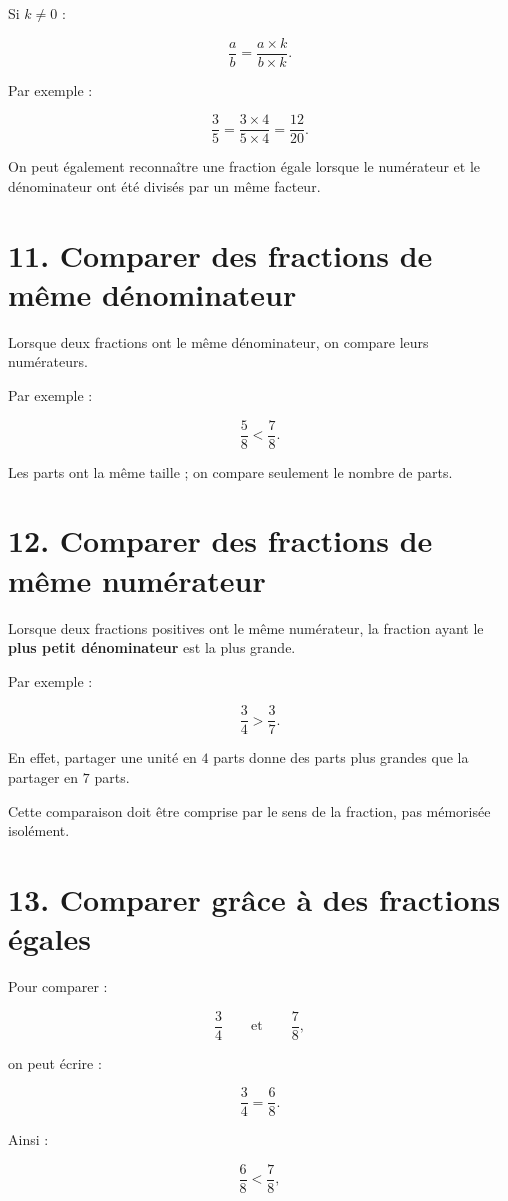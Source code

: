 Si $k\neq0$ :

\[
\boxed{
\dfrac{a}{b}
=
\dfrac{a\times k}{b\times k}
}.
\]

Par exemple :

\[
\dfrac{3}{5}
=
\dfrac{3\times4}{5\times4}
=
\dfrac{12}{20}.
\]

On peut également reconnaître une fraction égale lorsque le numérateur et le dénominateur ont été divisés par un même facteur.

\section{11. Comparer des fractions de même dénominateur}

Lorsque deux fractions ont le même dénominateur, on compare leurs numérateurs.

Par exemple :

\[
\dfrac{5}{8}<\dfrac{7}{8}.
\]

Les parts ont la même taille ; on compare seulement le nombre de parts.

\section{12. Comparer des fractions de même numérateur}

Lorsque deux fractions positives ont le même numérateur, la fraction ayant le \textbf{plus petit dénominateur} est la plus grande.

Par exemple :

\[
\dfrac{3}{4}>\dfrac{3}{7}.
\]

En effet, partager une unité en $4$ parts donne des parts plus grandes que la partager en $7$ parts.

Cette comparaison doit être comprise par le sens de la fraction, pas mémorisée isolément.

\section{13. Comparer grâce à des fractions égales}

Pour comparer :

\[
\dfrac{3}{4}
\qquad\text{et}\qquad
\dfrac{7}{8},
\]

on peut écrire :

\[
\dfrac{3}{4}
=
\dfrac{6}{8}.
\]

Ainsi :

\[
\dfrac{6}{8}<\dfrac{7}{8},
\]

